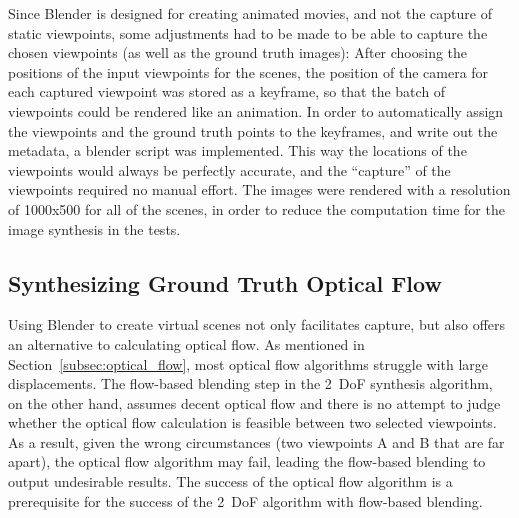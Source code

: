 Since Blender is designed for creating animated movies, and not the capture of static viewpoints, some adjustments had to be made to be able to capture the chosen viewpoints (as well as the ground truth images): After choosing the positions of the input viewpoints for the scenes, the position of the camera for each captured viewpoint was stored as a keyframe, so that the batch of viewpoints could be rendered like an animation. In order to automatically assign the viewpoints and the ground truth points to the keyframes, and write out the metadata, a blender script was implemented. This way the locations of the viewpoints would always be perfectly accurate, and the ``capture'' of the viewpoints required no manual effort. The images were rendered with a resolution of 1000x500 for all of the scenes, in order to reduce the computation time for the image synthesis in the tests.



\subsection{Synthesizing Ground Truth Optical Flow} \label{subsec:gt_of}
Using Blender to create virtual scenes not only facilitates capture, but also offers an alternative to calculating optical flow. As mentioned in Section~\ref{subsec:optical_flow}, most optical flow algorithms struggle with large displacements. The flow-based blending step in the 2~DoF synthesis algorithm, on the other hand, assumes decent optical flow and there is no attempt to judge whether the optical flow calculation is feasible between two selected viewpoints. As a result, given the wrong circumstances (two viewpoints A and B that are far apart), the optical flow algorithm may fail, leading the flow-based blending to output undesirable results. The success of the optical flow algorithm is a prerequisite for the success of the 2~DoF algorithm with flow-based blending.

